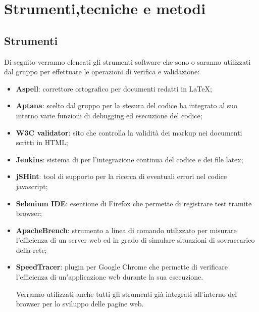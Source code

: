 
\section{Strumenti,tecniche e metodi}

\subsection{Strumenti}
\label{sec:strumenti}
Di seguito verranno elencati gli strumenti software che sono o saranno utilizzati dal gruppo per effettuare le operazioni di verifica e validazione:
\begin{itemize}

\item \textbf{Aspell}: correttore ortografico per documenti redatti in \LaTeX;

\item \textbf{Aptana}: scelto dal gruppo per la stesura del codice ha integrato al suo interno varie funzioni di debugging ed esecuzione del codice;

\item \textbf{W3C validator}: sito che controlla la validità dei markup nei documenti scritti in HTML;

\item \textbf{Jenkins}: sistema di per l'integrazione continua del codice e dei file latex;

\item \textbf{jSHint}: tool di supporto per la ricerca di eventuali errori nel codice javascript;

\item \textbf{Selenium IDE}: esentione di Firefox che permette di registrare test tramite browser;

\item \textbf{ApacheBrench}: strumento a linea di comando utilizzato per misurare l’efficienza di un server web ed in grado di simulare situazioni di sovraccarico della rete;

\item \textbf{SpeedTracer}: plugin per Google Chrome che permette di verificare l’efficienza di un’applicazione web durante la sua esecuzione.

Verranno utilizzati anche tutti gli strumenti già integrati all'interno del browser per lo sviluppo delle pagine web.

\end{itemize}
